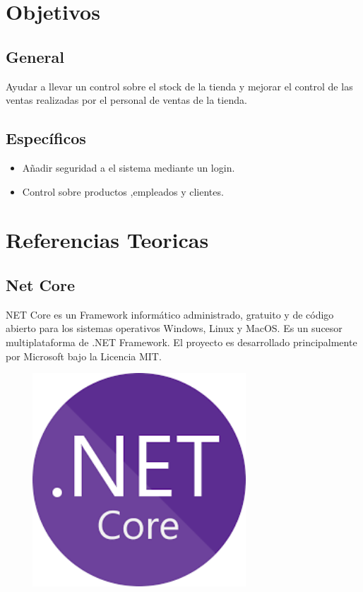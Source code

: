 \documentclass[12pt,letterpaper]{article}
\begin{document}
\section{Objetivos}
    \subsection{General}
    Ayudar a llevar un control sobre el stock de la tienda y mejorar el control de las ventas realizadas por el personal de ventas de la tienda.
    \subsection{Específicos}
    \begin{itemize}
        \item Añadir seguridad a el sistema mediante un login.
        \item Control sobre productos ,empleados y clientes.
    \end{itemize}

\section{Referencias Teoricas}

\subsection{Net Core}

NET Core es un Framework informático administrado, gratuito y de código abierto para los sistemas operativos Windows, Linux y MacOS. Es un sucesor multiplataforma de .NET Framework. El proyecto es desarrollado principalmente por Microsoft bajo la Licencia MIT.
\begin{center}
    \includegraphics[width=10cm, height=8cm]{img/netcore.png}  
\end{center}
\newpage
\end{document}
